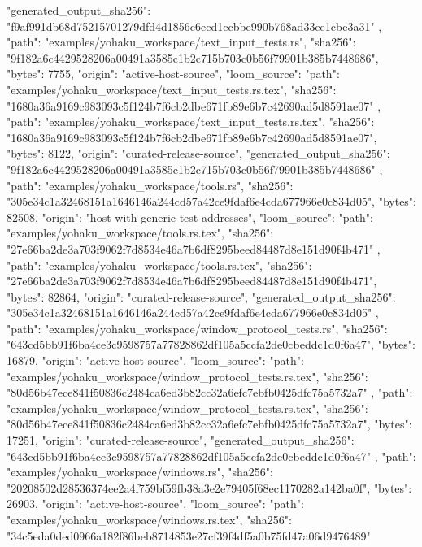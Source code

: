 {{      "generated_output_sha256": "f9af991db68d75215701279dfd4d1856c6ecd1ccbbe990b768ad33ee1cbe3a31"
    },
    {
      "path": "examples/yohaku_workspace/text_input_tests.rs",
      "sha256": "9f182a6c4429528206a00491a3585c1b2c715b703c0b56f79901b385b7448686",
      "bytes": 7755,
      "origin": "active-host-source",
      "loom_source": {
        "path": "examples/yohaku_workspace/text_input_tests.rs.tex",
        "sha256": "1680a36a9169c983093c5f124b7f6cb2dbe671fb89e6b7c42690ad5d8591ae07"
      }
    },
    {
      "path": "examples/yohaku_workspace/text_input_tests.rs.tex",
      "sha256": "1680a36a9169c983093c5f124b7f6cb2dbe671fb89e6b7c42690ad5d8591ae07",
      "bytes": 8122,
      "origin": "curated-release-source",
      "generated_output_sha256": "9f182a6c4429528206a00491a3585c1b2c715b703c0b56f79901b385b7448686"
    },
    {
      "path": "examples/yohaku_workspace/tools.rs",
      "sha256": "305e34c1a32468151a1646146a244cd57a42ce9fdaf6e4cda677966e0c834d05",
      "bytes": 82508,
      "origin": "host-with-generic-test-addresses",
      "loom_source": {
        "path": "examples/yohaku_workspace/tools.rs.tex",
        "sha256": "27e66ba2de3a703f9062f7d8534e46a7b6df8295beed84487d8e151d90f4b471"
      }
    },
    {
      "path": "examples/yohaku_workspace/tools.rs.tex",
      "sha256": "27e66ba2de3a703f9062f7d8534e46a7b6df8295beed84487d8e151d90f4b471",
      "bytes": 82864,
      "origin": "curated-release-source",
      "generated_output_sha256": "305e34c1a32468151a1646146a244cd57a42ce9fdaf6e4cda677966e0c834d05"
    },
    {
      "path": "examples/yohaku_workspace/window_protocol_tests.rs",
      "sha256": "643cd5bb91f6ba4ce3c9598757a77828862df105a5ccfa2de0cbeddc1d0f6a47",
      "bytes": 16879,
      "origin": "active-host-source",
      "loom_source": {
        "path": "examples/yohaku_workspace/window_protocol_tests.rs.tex",
        "sha256": "80d56b47ece841f50836c2484ca6ed3b82cc32a6efc7ebfb0425dfc75a5732a7"
      }
    },
    {
      "path": "examples/yohaku_workspace/window_protocol_tests.rs.tex",
      "sha256": "80d56b47ece841f50836c2484ca6ed3b82cc32a6efc7ebfb0425dfc75a5732a7",
      "bytes": 17251,
      "origin": "curated-release-source",
      "generated_output_sha256": "643cd5bb91f6ba4ce3c9598757a77828862df105a5ccfa2de0cbeddc1d0f6a47"
    },
    {
      "path": "examples/yohaku_workspace/windows.rs",
      "sha256": "20208502d28536374ee2a4f759bf59fb38a3e2e79405f68ec1170282a142ba0f",
      "bytes": 26903,
      "origin": "active-host-source",
      "loom_source": {
        "path": "examples/yohaku_workspace/windows.rs.tex",
        "sha256": "34c5eda0ded0966a182f86beb8714853e27cf39f4df5a0b75fd47a06d9476489"
}}}
